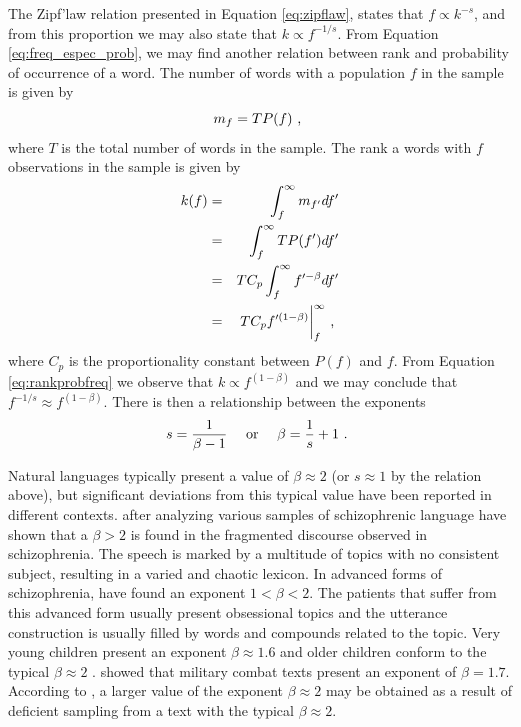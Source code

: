 The Zipf'law relation presented in Equation \ref{eq:zipflaw}, states that $f \propto k^{-s}$, and from
this proportion we may also state that $k \propto f^{-1/s}$. From Equation \ref{eq:freq_espec_prob},
we may find another relation between rank and probability of
occurrence of a word. The number of words with a population $f$ in the sample is given by
\begin{equation}
m_f = T P(f)   \textmd{ , }
\end{equation} 
where $T$ is the total number of words in the sample. The rank a words with $f$ observations in the sample
is given by 
\begin{eqnarray}
\label{eq:rankprobfreq}
k(f) &=& \int_f^{\infty} m_{f'} df' \nonumber \\ 
     &=& \int_f^{\infty} T P(f') df' \nonumber \\
     &=& T C_p \int_f^{\infty} f'^{-\beta} df' \nonumber \\
     &=& T C_p f'^{(1-\beta)} \biggr|_f^\infty \textmd{ , }
\end{eqnarray}
where $C_p$ is the proportionality constant between $P(f)$ and $f$.
From Equation \ref{eq:rankprobfreq} we observe that $k \propto f^{(1-\beta)}$ and 
we may conclude that $f^{-1/s} \approx f^{(1-\beta)}$. There is then a relationship between the 
exponents
\begin{equation}
s = \frac{1}{\beta - 1} \quad  \textmd{ or } \quad \beta = \frac{1}{s} + 1 \textmd{ . }
\end{equation}

Natural languages typically present a value of $\beta \approx 2$ (or $s \approx 1$ by the relation above), 
but significant deviations from this typical value have been reported
in different contexts. \cite{piotrovskii} after analyzing various samples of schizophrenic language
have shown that a $\beta > 2$ is found in the fragmented discourse observed in schizophrenia.
The speech is marked by a multitude of topics with no consistent subject, resulting in a varied
and chaotic lexicon. In advanced forms of schizophrenia, \cite{piotrovskii} have found an exponent
$1 < \beta < 2$. The patients that suffer from this advanced form usually present obsessional topics
and the utterance construction is usually filled by words and compounds related to the topic.
Very young children present an exponent $\beta \approx 1.6$ \citep{piotrovskii} and older children conform to 
the typical $\beta \approx 2$ \citep{zipf1942}. \cite{kolguskin1960} showed that military combat texts present 
an exponent of $\beta = 1.7$. According to \cite{piotrovskii}, a larger value of the exponent $\beta \approx 2$
may be obtained as a result of deficient sampling from a text with the typical $\beta \approx 2$.

